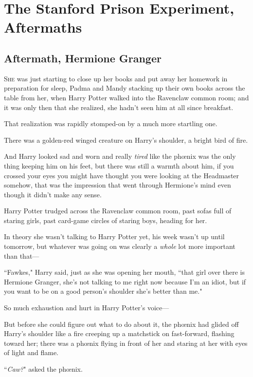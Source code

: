 \chapter{The Stanford Prison Experiment, Aftermaths}

\section{Aftermath, Hermione Granger}

\lettrine{S}{he} was just starting to close up her books and put away her homework in preparation for sleep, Padma and Mandy stacking up their own books across the table from her, when Harry Potter walked into the Ravenclaw common room; and it was only then that she realized, she hadn't seen him at all since breakfast.

That realization was rapidly stomped-on by a much more startling one.

There was a golden-red winged creature on Harry's shoulder, a bright bird of fire.

And Harry looked sad and worn and really \emph{tired} like the phœnix was the only thing keeping him on his feet, but there was still a warmth about him, if you crossed your eyes you might have thought you were looking at the Headmaster somehow, that was the impression that went through Hermione's mind even though it didn't make any sense.

Harry Potter trudged across the Ravenclaw common room, past sofas full of staring girls, past card-game circles of staring boys, heading for her.

In theory she wasn't talking to Harry Potter yet, his week wasn't up until tomorrow, but whatever was going on was clearly a \emph{whole} lot more important than that—

``Fawkes," Harry said, just as she was opening her mouth, ``that girl over there is Hermione Granger, she's not talking to me right now because I'm an idiot, but if you want to be on a good person's shoulder she's better than me."

So much exhaustion and hurt in Harry Potter's voice—

But before she could figure out what to do about it, the phœnix had glided off Harry's shoulder like a fire creeping up a matchstick on fast-forward, flashing toward her; there was a phœnix flying in front of her and staring at her with eyes of light and flame.

``\emph{Caw?}" asked the phœnix.


